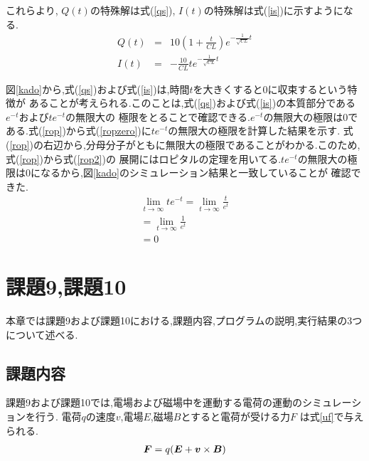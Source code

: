 \documentclass[a4j]{jarticle}
\begin{document}
        これらより, $Q(t)$の特殊解は式(\ref{qs}), $I(t)$の特殊解は式(\ref{is})に示すようになる.
        \begin{eqnarray}
          Q(t) &=& 10(1+\frac{t}{CL})e^{-\frac{1}{\sqrt{CL}}t} \label{qs} \\
          I(t) &=& -\frac{10}{CL}t e^{-\frac{1}{\sqrt{CL}}t} \label{is} 
        \end{eqnarray}        

        図\ref{kado}から,式(\ref{qs})および式(\ref{is})は,時間$t$を大きくすると0に収束するという特徴が
        あることが考えられる.このことは,式(\ref{qs})および式(\ref{is})の本質部分である$e^{-t}$および$te^{-t}$の無限大の
        極限をとることで確認できる.$e^{-t}$の無限大の極限は0である.式(\ref{rop})から式(\ref{ropzero})に$te^{-t}$の無限大の極限を計算した結果を示す.
        式(\ref{rop})の右辺から,分母分子がともに無限大の極限であることがわかる.このため,式(\ref{rop})から式(\ref{rop2})の
        展開にはロピタルの定理を用いてる.$te^{-t}$の無限大の極限は0になるから,図\ref{kado}のシミュレーション結果と一致していることが
        確認できた.
        \begin{eqnarray}
          \lim_{t \to \infty} te^{-t} = \lim_{t \to \infty} \frac{t}{e^t} \label{rop} \\
                                      = \lim_{t \to \infty} \frac{1}{e^t} \label{rop2} \\
                                      = 0　\label{ropzero}
        \end{eqnarray}  

        \section{課題9,課題10}
      本章では課題9および課題10における,課題内容,プログラムの説明,実行結果の3つについて述べる.
      \subsection{課題内容}
      課題9および課題10では,電場および磁場中を運動する電荷の運動のシミュレーションを行う.
      電荷$q$の速度\mbox{\boldmath $v$},電場\mbox{\boldmath $E$},磁場\mbox{\boldmath $B$}とすると電荷が受ける力\mbox{\boldmath $F$}
      は式\ref{uf}で与えられる.
      \begin{eqnarray}
        \mbox{\boldmath $F$} = q(\mbox{\boldmath $E$}+\mbox{\boldmath $v$} \times \mbox{\boldmath $B$}) \label{uf}
      \end{eqnarray}
\end{document}
